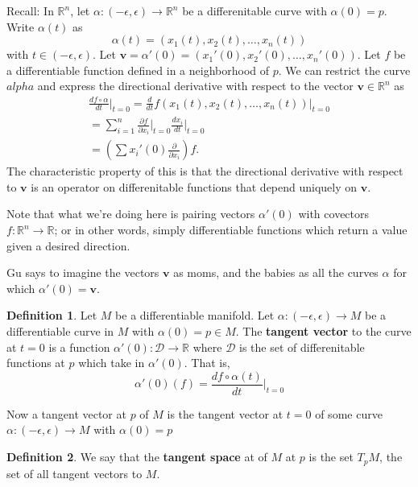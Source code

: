 \documentclass[12pt,letterpaper,boxed]{maths_v5}
\newcommand{\rr}{\mathbb{R}}
\theoremstyle{definition}
\newtheorem{definition}{Definition}[section]
\begin{document}
    Recall: In $\rr^n$, let $\alpha: (-\epsilon, \epsilon) \to \rr^n$ be a differenitable 
    curve with $\alpha(0) = p$. Write $\alpha(t)$ as 
    \[
        \alpha(t) = (x_1(t), x_2(t), \dots, x_n(t))
    \]
    with $t \in (-\epsilon, \epsilon)$. Let $\bm{v} = \alpha'(0) = 
    (x_1'(0), x_2'(0), \dots, x_n'(0))$. Let $f$ be a differentiable function defined 
    in a neighborhood of $p$. We can restrict the curve $
    alpha$ and express the directional derivative with respect to the vector $\bm{v} \in \rr^n$ as 
    \begin{align*}
        \frac{df\circ\alpha}{dt}\big|_{t = 0} = \frac{d}{dt}f(x_1(t), x_2(t), \dots, x_n(t))\big|_{t = 0}\\
        = \sum_{i=1}^{n}\frac{\partial f}{\partial x_i}\big|_{t=0}\frac{dx_i}{dt}\big|_{t=0}\\
        = \left( \sum x_i'(0) \frac{\partial}{\partial x_i} \right)f.
    \end{align*}
    The characteristic property of this is that the directional derivative with respect to $\bm{v}$ 
    is an operator on  differenitable functions that depend uniquely on $\bm{v}$. 

    Note that what we're doing here is pairing vectors $\alpha'(0)$ with covectors $f:\rr^n \to \rr$; 
    or in other words, simply differentiable functions which return a value given a desired direction. 

    Gu says to imagine the vectors $\bm{v}$ as moms, and the babies as all the curves $\alpha$ for which 
    $\alpha'(0)= \bm{v}$. 

    \begin{definition}
        Let  $M$ be a differentiable manifold. Let $\alpha:(-\epsilon, \epsilon) \to M$ be 
        a differentiable curve in $M$ with $\alpha(0) = p \in M$. The \textbf{tangent vector}
        to the  curve at  $t = 0$ is a function $\alpha'(0): \mathcal{D} \to \rr$ 
        where $\mathcal{D}$ is the set of differenitable functions at $p$ which take in $\alpha'(0)$. That is, 
        \[
            \alpha'(0)(f) = \frac{df\circ \alpha(t)}{dt}\big|_{t=0}
        \]
    \end{definition}

    Now a tangent vector at $p$ of $M$ is the tangent  vector at $t = 0$ of some curve  
    $\alpha:(-\epsilon, \epsilon) \to M$ with $\alpha(0) = p$

    \begin{definition}
        We say that the \textbf{tangent space} at of $M$ at $p$ is the set 
        $T_pM$, the set of all tangent vectors to $M$.
    \end{definition}
\end{document}
